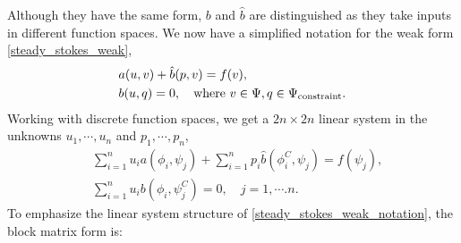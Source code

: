 Although they have the same form, $b$ and $\hat{b}$ are distinguished as they take inputs in different function spaces.
We now have a simplified notation for the weak form \eqref{steady_stokes_weak},
\begin{equation}\label{steady_stokes_weak_notation}
\begin{split}
    &a(u, v) + \hat{b}(p, v) = f(v),\\
    &b(u, q) = 0, \quad\text{where $v \in \Psi, q \in {\Psi_{\text{constraint}}}$}.
\end{split}
\end{equation}
Working with discrete function spaces, we get a $2n\times 2n$ linear system in the unknowns $u_1,\cdots,u_n$ and $p_1,\cdots,p_n$,
\begin{equation}
\begin{split}
    &\sum_{i=1}^n u_i a\left(\phi_i, \psi_j\right) + \sum_{i=1}^np_i\hat{b}\left(\phi^C_i, \psi_j\right) = f(\psi_j),\\
    &\sum_{i=1}^nu_ib\left(\phi_i, \psi^C_j\right) = 0,\quad j=1,\cdots.n.
\end{split}
\end{equation}
To emphasize the linear system structure of \eqref{steady_stokes_weak_notation}, the block matrix form is:
